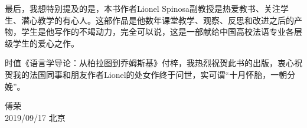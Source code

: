 最后，我想特别提及的是，本书作者Lionel Spinosa副教授是热爱教书、关注学生、潜心教学的有心人。这部作品是他数年课堂教学、观察、反思和改进之后的产物，学生是他写作的不竭动力，完全可以说，这是一部献给中国高校法语专业各层级学生的爱心之作。

时值《语言学导论：从柏拉图到乔姆斯基》付梓，我热烈祝贺此书的出版，衷心祝贺我的法国同事和朋友作者Lionel的处女作终于问世，实可谓“十月怀胎，一朝分娩”。
\begin{flushright}傅\quad 荣\\2019/09/17 北京\end{flushright}
